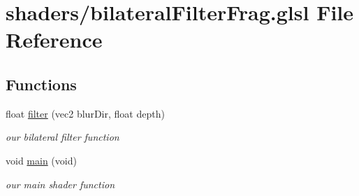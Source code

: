 \hypertarget{bilateral_filter_frag_8glsl}{\section{shaders/bilateral\-Filter\-Frag.glsl File Reference}
\label{bilateral_filter_frag_8glsl}
}
\subsection*{Functions}
\begin{DoxyCompactItemize}
\item 
float \hyperlink{bilateral_filter_frag_8glsl_a7fc9433dc7caa1f33078fafa0bf43dda}{filter} (vec2 blur\-Dir, float depth)
\begin{DoxyCompactList}\small\item\em our bilateral filter function \end{DoxyCompactList}\item 
\hypertarget{bilateral_filter_frag_8glsl_a6288eba0f8e8ad3ab1544ad731eb7667}{void \hyperlink{bilateral_filter_frag_8glsl_a6288eba0f8e8ad3ab1544ad731eb7667}{main} (void)}\label{bilateral_filter_frag_8glsl_a6288eba0f8e8ad3ab1544ad731eb7667}

\begin{DoxyCompactList}\small\item\em our main shader function \end{DoxyCompactList}\end{DoxyCompactItemize}
